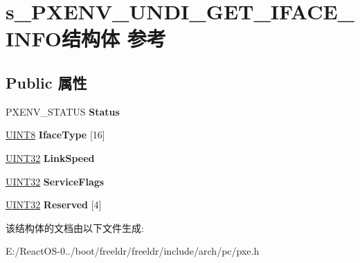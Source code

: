 \hypertarget{structs___p_x_e_n_v___u_n_d_i___g_e_t___i_f_a_c_e___i_n_f_o}{}\section{s\+\_\+\+P\+X\+E\+N\+V\+\_\+\+U\+N\+D\+I\+\_\+\+G\+E\+T\+\_\+\+I\+F\+A\+C\+E\+\_\+\+I\+N\+F\+O结构体 参考}
\label{structs___p_x_e_n_v___u_n_d_i___g_e_t___i_f_a_c_e___i_n_f_o}
\subsection*{Public 属性}
\begin{DoxyCompactItemize}
\item 
\mbox{\label{structs___p_x_e_n_v___u_n_d_i___g_e_t___i_f_a_c_e___i_n_f_o_a3f3576187c9688056b43ddce6bfc63a5}} 
P\+X\+E\+N\+V\+\_\+\+S\+T\+A\+T\+US {\bfseries Status}
\item 
\mbox{\label{structs___p_x_e_n_v___u_n_d_i___g_e_t___i_f_a_c_e___i_n_f_o_a53f836745e3a052233be7cb67d8765da}} 
\hyperlink{_processor_bind_8h_ab27e9918b538ce9d8ca692479b375b6a}{U\+I\+N\+T8} {\bfseries Iface\+Type} \mbox{[}16\mbox{]}
\item 
\mbox{\label{structs___p_x_e_n_v___u_n_d_i___g_e_t___i_f_a_c_e___i_n_f_o_a9b09edd0228695388ea93dd6a95f16e4}} 
\hyperlink{_processor_bind_8h_ae1e6edbbc26d6fbc71a90190d0266018}{U\+I\+N\+T32} {\bfseries Link\+Speed}
\item 
\mbox{\label{structs___p_x_e_n_v___u_n_d_i___g_e_t___i_f_a_c_e___i_n_f_o_a3ab5e133f141866dada771c2305a5e21}} 
\hyperlink{_processor_bind_8h_ae1e6edbbc26d6fbc71a90190d0266018}{U\+I\+N\+T32} {\bfseries Service\+Flags}
\item 
\mbox{\label{structs___p_x_e_n_v___u_n_d_i___g_e_t___i_f_a_c_e___i_n_f_o_ae3569155efc227b6c3cc3612bd087c70}} 
\hyperlink{_processor_bind_8h_ae1e6edbbc26d6fbc71a90190d0266018}{U\+I\+N\+T32} {\bfseries Reserved} \mbox{[}4\mbox{]}
\end{DoxyCompactItemize}


该结构体的文档由以下文件生成\+:\begin{DoxyCompactItemize}
\item 
E\+:/\+React\+O\+S-\/0../boot/freeldr/freeldr/include/arch/pc/pxe.\+h\end{DoxyCompactItemize}
